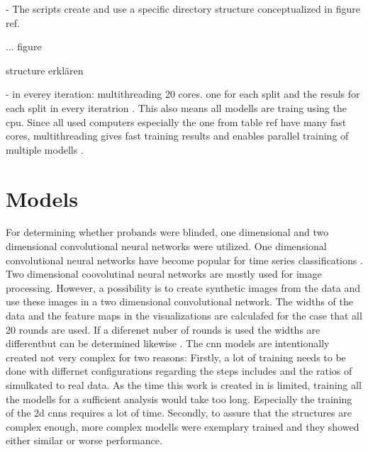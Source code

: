 - The scripts create and use a specific directory structure conceptualized in figure ref.

... figure 


structure erklären

- in everey iteration: multithreading 20 cores. one for each split and the resuls for each split in every iteratrion . This also means all modells are traing using the cpu. Since all used computers especially the one from table ref have many fast cores, multithreading gives fast training results and enables parallel training of multiple modells .   

\section{Models}
For determining whether probands were blinded, one dimensional and two dimensional convolutional neural networks were utilized. One dimensional convolutional neural networks have become popular for time series classifications . Two dimensional coovolutinal neural networks are mostly used for image processing. However, a possibility is to create synthetic images from the data and use these images in a two dimensional convolutional network. The widths of the data and the feature maps in the visualizations are calculafed for the case that all 20 rounds are used. If a diferenet nuber of rounds is used the widths are differentbut can be determined likewise . The cnn models are intentionally created not very complex for two reasons: Firstly, a lot of training needs to be done with differnet configurations regarding the steps includes and the ratios of simulkated to real data. As the time this work is created in is limited, training all the modells for a sufficient analysis would take too long. Especially the training of the 2d cnns requires a lot of time. Secondly, to assure that the structures are complex enough, more complex modells were exemplary trained and they showed either similar or worse performance.

